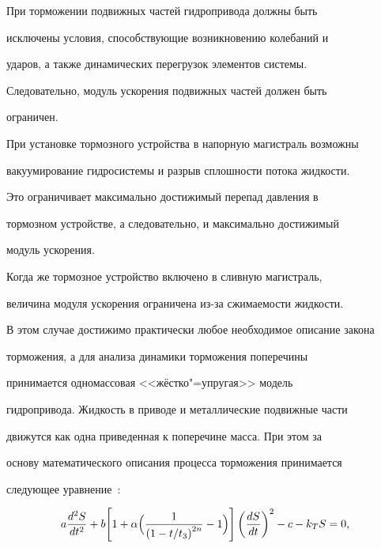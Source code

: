 \smallskip



 При торможении подвижных частей гидропривода должны быть

исключены условия, способствующие возникновению колебаний и

ударов, а также динамических перегрузок элементов системы.

Следовательно, модуль ускорения подвижных частей должен быть

ограничен.



При установке тормозного устройства в напорную магистраль возможны

вакуумирование гидросистемы и разрыв сплошности потока жидкости.

Это ограничивает максимально достижимый перепад давления в

тормозном устройстве, а следовательно, и максимально достижимый

модуль ускорения.



Когда же тормозное устройство включено в сливную магистраль,

величина модуля ускорения ограничена из-за сжимаемости жидкости. 

В этом случае достижимо практически любое  необходимое описание закона

торможения, а для анализа динамики торможения поперечины

принимается одномассовая <<жёстко"=упругая>>  модель

гидропривода. Жидкость в приводе и металлические подвижные части

движутся как одна приведенная к поперечине масса. При этом за

основу математического описания процесса торможения принимается

следующее уравнение~\cite{korchak:bib:SamGTU}:

\begin{equation}

       a\frac{d^2S}{dt^2}+b

             \Biggl[1+\alpha \Bigl(\frac{1}{\left(1-{t}/{t_{3}}

                                              \right)^{2 n}}-1

                               \Bigr)

             \Biggr]\left(\frac{dS}{dt}\right)^{2}-c-k_{T} S=0,

\label{equ:mat-mod}

\end{equation}

